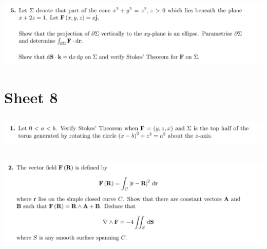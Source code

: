\subsection{}
\begin{mdframed}
  \includegraphics[width=400pt]{img/oxford-prelims-M5-multivariable-calc-7-5.png}
\end{mdframed}


\newpage
\section{Sheet 8}

\subsection{}
\begin{mdframed}
  \includegraphics[width=400pt]{img/oxford-prelims-M5-multivariable-calc-8-1.png}
\end{mdframed}

\subsection{}
\begin{mdframed}
  \includegraphics[width=400pt]{img/oxford-prelims-M5-multivariable-calc-8-2.png}
\end{mdframed}

